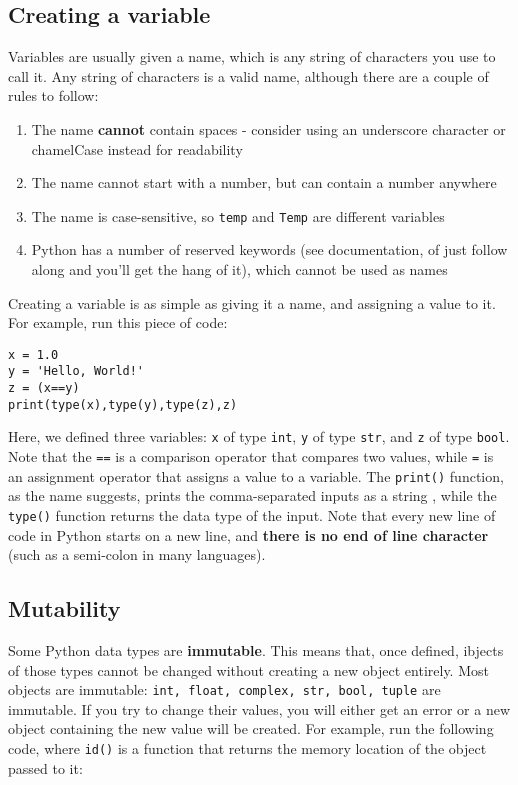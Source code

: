 \documentclass[12pt]{article}
\newcommand{\code}{\texttt}
\begin{document}
\subsection{Creating a variable}
Variables are usually given a name, which is any string of characters you use to call it. Any string of characters is a valid name, although there are a couple of rules to follow:

\begin{enumerate}
	\item The name \textbf{cannot} contain spaces - consider using an underscore character or chamelCase instead for readability
	\item The name cannot start with a number, but can contain a number anywhere
	\item The name is case-sensitive, so \code{temp} and \code{Temp} are different variables
	\item Python has a number of reserved keywords (see documentation, of just follow along and you'll get the hang of it), which cannot be used as names
\end{enumerate}

Creating a variable is as simple as giving it a name, and assigning a value to it. For example, run this piece of code:

\begin{lstlisting}[frame=single] 
x = 1.0
y = 'Hello, World!'
z = (x==y)
print(type(x),type(y),type(z),z)
\end{lstlisting}

Here, we defined three variables: \code{x} of type \code{int}, \code{y} of type \code{str}, and \code{z} of type \code{bool}. Note that the \code{==} is a comparison operator that compares two values, while \code{=} is an assignment operator that assigns a value to a variable. The \code{print()} function, as the name suggests, prints the comma-separated inputs as a string , while the \code{type()} function returns the data type of the input. Note that every new line of code in Python starts on a new line, and \textbf{there is no end of line character} (such as a semi-colon in many languages).

\subsection{Mutability}

Some Python data types are \textbf{immutable}. This means that, once defined, ibjects of those types cannot be changed without creating a new object entirely. Most objects are immutable: \code{int, float, complex, str, bool, tuple} are immutable. If you try to change their values, you will either get an error or a new object containing the new value will be created. For example, run the following code, where \code{id()} is a function that returns the memory location of the object passed to it:
\end{document}
